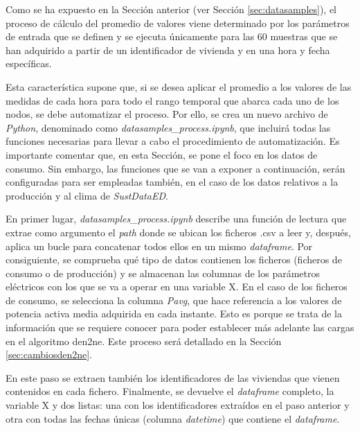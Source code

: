 Como se ha expuesto en la Sección anterior (ver Sección \ref{sec:datasamples}), el proceso de cálculo del promedio de valores viene determinado por los parámetros de entrada que se definen y se ejecuta únicamente para las 60 muestras que se han adquirido a partir de un identificador de vivienda y en una hora y fecha específicas. 

\vspace{3mm}

Esta característica supone que, si se desea aplicar el promedio a los valores de las medidas de cada hora para todo el rango temporal que abarca cada uno de los nodos, se debe automatizar el proceso. Por ello, se crea un nuevo archivo de \textit{Python}, denominado como \textit{datasamples\_process.ipynb}, que incluirá todas las funciones necesarias para llevar a cabo el procedimiento de automatización. Es importante comentar que, en esta Sección, se pone el foco en los datos de consumo. Sin embargo, las funciones que se van a exponer a continuación, serán configuradas para ser empleadas también, en el caso de los datos relativos a la producción y al clima de \textit{SustDataED}.

\vspace{3mm}

En primer lugar, \textit{datasamples\_process.ipynb} describe una función de lectura que extrae como argumento el \textit{path} donde se ubican los ficheros .csv a leer y, después, aplica un bucle para concatenar todos ellos en un mismo \textit{dataframe}. Por consiguiente, se comprueba qué tipo de datos contienen los ficheros (ficheros de consumo o de producción) y se almacenan las columnas de los parámetros eléctricos con los que se va a operar en una variable X. En el caso de los ficheros de consumo, se selecciona la columna \textit{Pavg}, que hace referencia a los valores de potencia activa media adquirida en cada instante. Esto es porque se trata de la información que se requiere conocer para poder establecer más adelante las cargas en el algoritmo \gls{den2ne}. Este proceso será detallado en la Sección \ref{sec:cambiosden2ne}.

\vspace{3mm}

En este paso se extraen también los identificadores de las viviendas que vienen contenidos en cada fichero. Finalmente, se devuelve el \textit{dataframe} completo, la variable X y dos listas: una con los identificadores extraídos en el paso anterior y otra con todas las fechas únicas (columna \textit{datetime}) que contiene el \textit{dataframe}.

